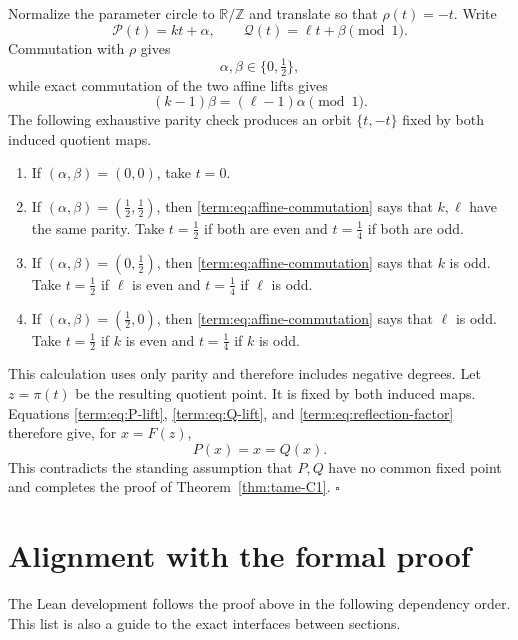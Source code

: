 \documentclass[11pt]{article}
\theoremstyle{definition}
\theoremstyle{remark}
\begin{document}
Normalize the parameter circle to \(\mathbb R/\mathbb Z\) and translate so
that \(\rho(t)=-t\).  Write
\[
 \mathcal P(t)=kt+\alpha,\qquad
 \mathcal Q(t)=\ell t+\beta\pmod1.
\]
Commutation with \(\rho\) gives
\begin{equation}\label{term:eq:half-translations}
 \alpha,\beta\in\{0,\tfrac12\},
\end{equation}
while exact commutation of the two affine lifts gives
\begin{equation}\label{term:eq:affine-commutation}
 (k-1)\beta=(\ell-1)\alpha\pmod1.
\end{equation}
The following exhaustive parity check produces an orbit
\(\{t,-t\}\) fixed by both induced quotient maps.
\begin{enumerate}
 \item[(i)] If \((\alpha,\beta)=(0,0)\), take \(t=0\).
 \item[(ii)] If \((\alpha,\beta)=(\tfrac12,\tfrac12)\), then
 \eqref{term:eq:affine-commutation} says that \(k,\ell\) have the same
 parity.  Take \(t=\tfrac12\) if both are even and \(t=\tfrac14\) if both
 are odd.
 \item[(iii)] If \((\alpha,\beta)=(0,\tfrac12)\), then
 \eqref{term:eq:affine-commutation} says that \(k\) is odd.  Take
 \(t=\tfrac12\) if \(\ell\) is even and \(t=\tfrac14\) if \(\ell\) is odd.
 \item[(iv)] If \((\alpha,\beta)=(\tfrac12,0)\), then
 \eqref{term:eq:affine-commutation} says that \(\ell\) is odd.  Take
 \(t=\tfrac12\) if \(k\) is even and \(t=\tfrac14\) if \(k\) is odd.
\end{enumerate}
This calculation uses only parity and therefore includes negative degrees.
Let \(z=\pi(t)\) be the resulting quotient point.  It is fixed by both
induced maps.  Equations \eqref{term:eq:P-lift},
\eqref{term:eq:Q-lift}, and \eqref{term:eq:reflection-factor} therefore give,
for \(x=F(z)\),
\[
 P(x)=x=Q(x).
\]
This contradicts the standing assumption that \(P,Q\) have no common fixed
point and completes the proof of Theorem~\ref{thm:tame-C1}.
\hfill\(\square\)\par

\section*{Alignment with the formal proof}

The Lean development follows the proof above in the following dependency
order.  This list is also a guide to the exact interfaces between sections.
\end{document}
